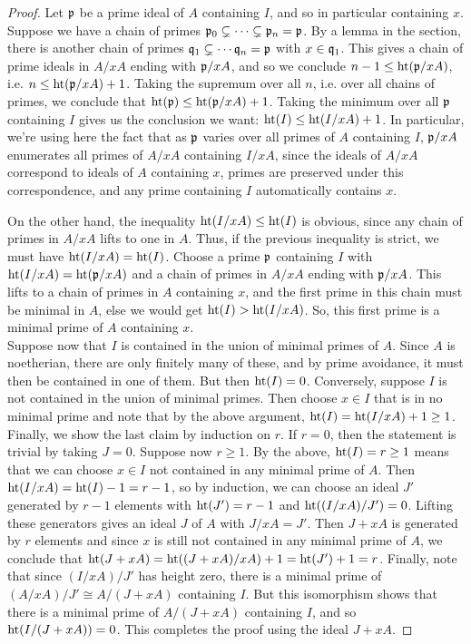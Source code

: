 \begin{proof}
	Let $\mathfrak{p}$ be a prime ideal of $A$ containing $I$, and so in particular containing $x$. Suppose we have a chain of primes $\mathfrak{p}_0 \subsetneq \cdots \subsetneq \mathfrak{p}_n = \mathfrak{p}$. By a lemma in the section, there is another chain of primes $\mathfrak{q}_1 \subsetneq \cdots \mathfrak{q}_n = \mathfrak{p}$ with $x \in \mathfrak{q}_1$. This gives a chain of prime ideals in $A/xA$ ending with $\mathfrak{p}/xA$, and so we conclude $n-1 \leq \operatorname{ht}(\mathfrak{p}/xA)$, i.e. $n \leq \operatorname{ht}(\mathfrak{p}/xA)+1$. Taking the supremum over all $n$, i.e. over all chains of primes, we conclude that $\operatorname{ht}(\mathfrak{p}) \leq \operatorname{ht}(\mathfrak{p}/xA)+1$. Taking the minimum over all $\mathfrak{p}$ containing $I$ gives us the conclusion we want: $\operatorname{ht}(I) \leq \operatorname{ht}(I/xA)+1$. In particular, we're using here the fact that as $\mathfrak{p}$ varies over all primes of $A$ containing $I$, $\mathfrak{p}/xA$ enumerates all primes of $A/xA$ containing $I/xA$, since the ideals of $A/xA$ correspond to ideals of $A$ containing $x$, primes are preserved under this correspondence, and any prime containing $I$ automatically contains $x$.
	
	On the other hand, the inequality $\operatorname{ht}(I/xA) \leq \operatorname{ht}(I)$ is obvious, since any chain of primes in $A/xA$ lifts to one in $A$. Thus, if the previous inequality is strict, we must have $\operatorname{ht}(I/xA) = \operatorname{ht}(I)$. Choose a prime $\mathfrak{p}$ containing $I$ with $\operatorname{ht}(I/xA) = \operatorname{ht}(\mathfrak{p}/xA)$ and a chain of primes in $A/xA$ ending with $\mathfrak{p}/xA$. This lifts to a chain of primes in $A$ containing $x$, and the first prime in this chain must be minimal in $A$, else we would get $\operatorname{ht}(I) > \operatorname{ht}(I/xA)$. So, this first prime is a minimal prime of $A$ containing $x$. \\
	
	Suppose now that $I$ is contained in the union of minimal primes of $A$. Since $A$ is noetherian, there are only finitely many of these, and by prime avoidance, it must then be contained in one of them. But then $\operatorname{ht}(I) = 0$. Conversely, suppose $I$ is not contained in the union of minimal primes. Then choose $x \in I$ that is in no minimal prime and note that by the above argument, $\operatorname{ht}(I) = \operatorname{ht}(I/xA)+1 \geq 1$. \\
	
	Finally, we show the last claim by induction on $r$. If $r=0$, then the statement is trivial by taking $J = 0$. Suppose now $r \geq 1$. By the above, $\operatorname{ht}(I) = r \geq 1$ means that we can choose $x \in I$ not contained in any minimal prime of $A$. Then $\operatorname{ht}(I/xA) = \operatorname{ht}(I)-1 = r-1$, so by induction, we can choose an ideal $J'$ generated by $r-1$ elements with $\operatorname{ht}(J') = r-1$ and $\operatorname{ht}((I/xA)/J') = 0$. Lifting these generators gives an ideal $J$ of $A$ with $J/xA = J'$. Then $J+xA$ is generated by $r$ elements and since $x$ is still not contained in any minimal prime of $A$, we conclude that $\operatorname{ht}(J+xA) = \operatorname{ht}((J+xA)/xA)+1 = \operatorname{ht}(J')+1 = r$. Finally, note that since $(I/xA)/J'$ has height zero, there is a minimal prime of $(A/xA)/J' \cong A/(J+xA)$ containing $I$. But this isomorphism shows that there is a minimal prime of $A/(J+xA)$ containing $I$, and so $\operatorname{ht}(I/(J+xA)) = 0$. This completes the proof using the ideal $J+xA$.
\end{proof}
